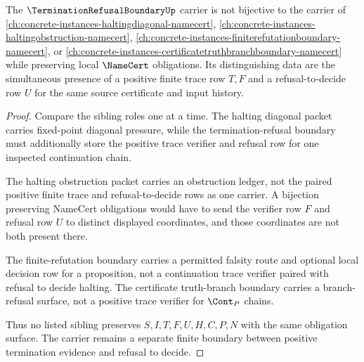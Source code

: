 \begin{theorem}
\label{thm:termination-refusal-boundary-independence}
The $\TerminationRefusalBoundaryUp$ carrier is not bijective to the carrier of \autoref{ch:concrete-instances-haltingdiagonal-namecert}, \autoref{ch:concrete-instances-haltingobstruction-namecert}, \autoref{ch:concrete-instances-finiterefutationboundary-namecert}, or \autoref{ch:concrete-instances-certificatetruthbranchboundary-namecert} while preserving local $\NameCert$ obligations. Its distinguishing data are the simultaneous presence of a positive finite trace row $T,F$ and a refusal-to-decide row $U$ for the same source certificate and input history.
\end{theorem}
\begin{proof}
Compare the sibling roles one at a time. The halting diagonal packet carries fixed-point diagonal pressure, while the termination-refusal boundary must additionally store the positive trace verifier and refusal row for one inspected continuation chain.

The halting obstruction packet carries an obstruction ledger, not the paired positive finite trace and refusal-to-decide rows as one carrier. A bijection preserving NameCert obligations would have to send the verifier row $F$ and refusal row $U$ to distinct displayed coordinates, and those coordinates are not both present there.

The finite-refutation boundary carries a permitted falsity route and optional local decision row for a proposition, not a continuation trace verifier paired with refusal to decide halting. The certificate truth-branch boundary carries a branch-refusal surface, not a positive trace verifier for $\Cont_P$ chains.

Thus no listed sibling preserves $S,I,T,F,U,H,C,P,N$ with the same obligation surface. The carrier remains a separate finite boundary between positive termination evidence and refusal to decide.
\end{proof}

